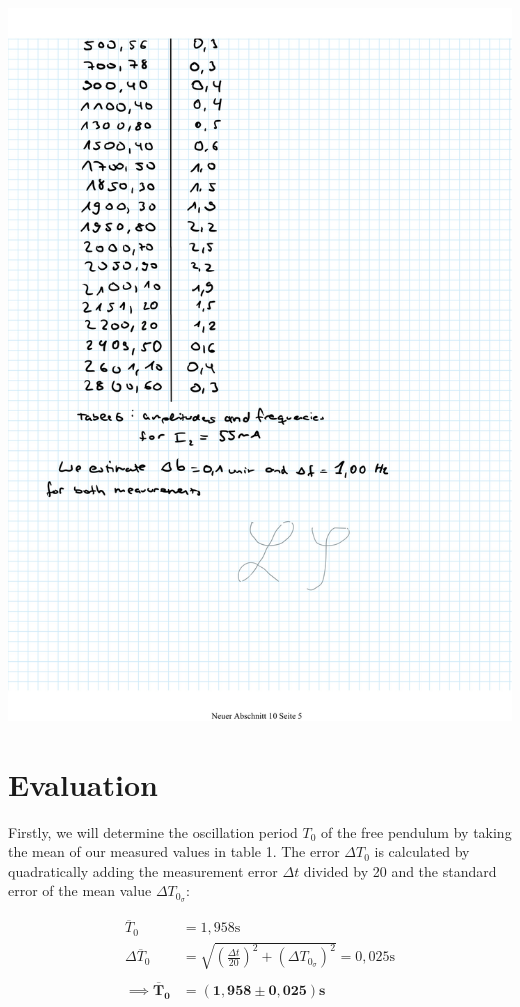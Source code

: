 \documentclass{article}
\begin{document}
\includegraphics[width=\textwidth]{graphics/mess5.jpg}
\newpage

\addtocounter{table}{6}

\section{Evaluation}

Firstly, we will determine the oscillation period $T_0$ of the free pendulum by taking the mean of our measured values in table 1. The error $\Delta T_0$ is calculated by quadratically adding the measurement error $\Delta t$ divided by 20 and the standard error of the mean value $\Delta T_{0_\sigma}$:

\begin{equation}
    \begin{split}
        \overline{T}_0 &= 1,958 \text{s} \\
        \Delta \overline{T}_0 &= \sqrt{\left( \frac{\Delta t}{20} \right)^2 + (\Delta T_{0_\sigma})^2} = 0,025 \text{s}\\ \\
        \implies \bm{\overline{T}_0} &= \bm{(1,958\pm0,025)} \textbf{s}
    \end{split}
    \label{eq:99}
\end{equation}
\end{document}
